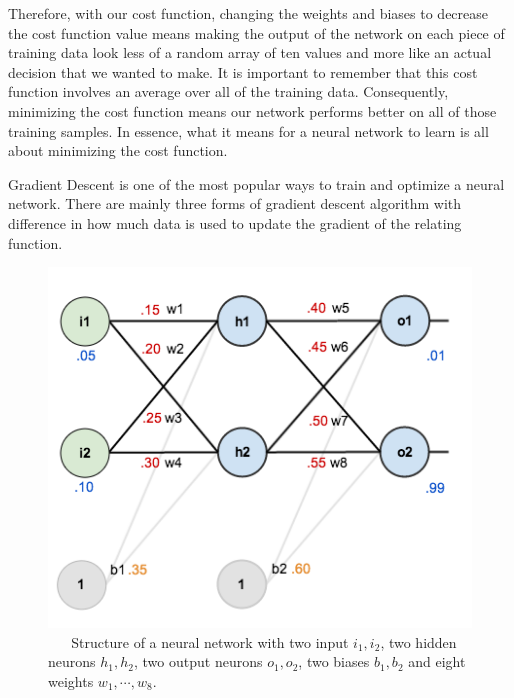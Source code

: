\documentclass[master]{thesis-uestc}
\begin{document}
Therefore, with our cost function, changing the weights and biases to decrease the cost function value means making the output of the network on each piece of training data look less of a random array of ten values and more like an actual decision that we wanted to make. It is important to remember that this cost function involves an average over all of the training data. Consequently, minimizing the cost function means our network performs better on all of those training samples. In essence, what it means for a neural network to learn is all about minimizing the cost function.

Gradient Descent is one of the most popular ways to train and optimize a neural network. There are mainly three forms of gradient descent algorithm with difference in how much data is used to update the gradient of the relating function.

\begin{figure}[ht]
\includegraphics[width=5in]{pic/network_example2.png}
\caption{\,\,\,\,\,\,\,\,\,\,Structure of a neural network with two input $i_1, i_2$,  two hidden neurons $h_1, h_2$, two output neurons $o_1, o_2$, two biases $b_1, b_2$ and eight weights $w_1, \cdots, w_8$.}
\label{neural_net_example}
\end{figure}
\end{document}

